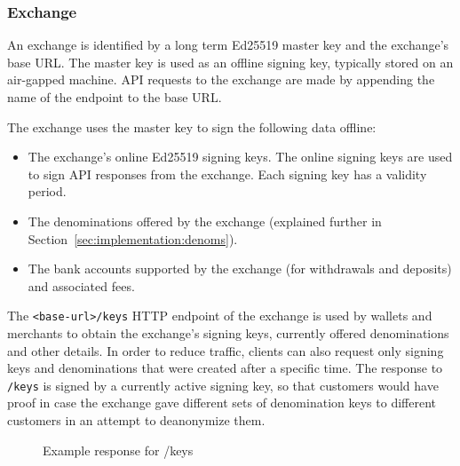 \subsubsection{Exchange}
An exchange is identified by a long term Ed25519 master key and the exchange's
base URL.  The master key is used as an offline signing key, typically stored
on an air-gapped machine.  API requests to the exchange are made by appending
the name of the endpoint to the base URL.

The exchange uses the master key to sign the following data offline:
\begin{itemize}
  \item The exchange's online Ed25519 signing keys.  The online signing keys
    are used to sign API responses from the exchange.  Each signing key has a
    validity period.
  \item The denominations offered by the exchange (explained further in Section~\ref{sec:implementation:denoms}).
  \item The bank accounts supported by the exchange (for withdrawals and deposits) and associated fees.
\end{itemize}

The \texttt{<base-url>/keys} HTTP endpoint of the exchange is used by wallets
and merchants to obtain the exchange's signing keys, currently offered
denominations and other details.  In order to reduce traffic, clients can also
request only signing keys and denominations that were created after a specific
time.  The response to \texttt{/keys} is signed by a currently active signing
key, so that customers would have proof in case the exchange gave different sets of
denomination keys to different customers in an attempt to deanonymize them.


\begin{figure}
  \begin{multicols}{2}
  
  \end{multicols}
  \caption{Example response for /keys}
\end{figure}


